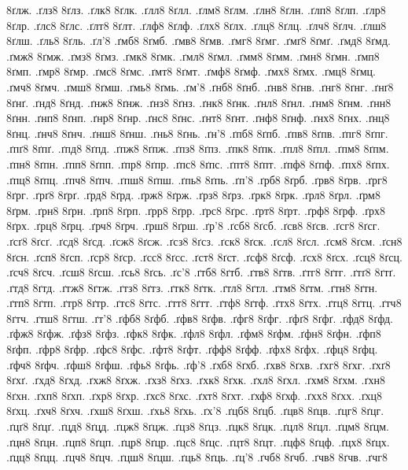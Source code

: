 {8ґлж.
.ґлз8
8ґлз.
.ґлк8
8ґлк.
.ґлл8
8ґлл.
.ґлм8
8ґлм.
.ґлн8
8ґлн.
.ґлп8
8ґлп.
.ґлр8
8ґлр.
.ґлс8
8ґлс.
.ґлт8
8ґлт.
.ґлф8
8ґлф.
.ґлх8
8ґлх.
.ґлц8
8ґлц.
.ґлч8
8ґлч.
.ґлш8
8ґлш.
.ґль8
8ґль.
.ґл'8
.ґмб8
8ґмб.
.ґмв8
8ґмв.
.ґмг8
8ґмг.
.ґмґ8
8ґмґ.
.ґмд8
8ґмд.
.ґмж8
8ґмж.
.ґмз8
8ґмз.
.ґмк8
8ґмк.
.ґмл8
8ґмл.
.ґмм8
8ґмм.
.ґмн8
8ґмн.
.ґмп8
8ґмп.
.ґмр8
8ґмр.
.ґмс8
8ґмс.
.ґмт8
8ґмт.
.ґмф8
8ґмф.
.ґмх8
8ґмх.
.ґмц8
8ґмц.
.ґмч8
8ґмч.
.ґмш8
8ґмш.
.ґмь8
8ґмь.
.ґм'8
.ґнб8
8ґнб.
.ґнв8
8ґнв.
.ґнг8
8ґнг.
.ґнґ8
8ґнґ.
.ґнд8
8ґнд.
.ґнж8
8ґнж.
.ґнз8
8ґнз.
.ґнк8
8ґнк.
.ґнл8
8ґнл.
.ґнм8
8ґнм.
.ґнн8
8ґнн.
.ґнп8
8ґнп.
.ґнр8
8ґнр.
.ґнс8
8ґнс.
.ґнт8
8ґнт.
.ґнф8
8ґнф.
.ґнх8
8ґнх.
.ґнц8
8ґнц.
.ґнч8
8ґнч.
.ґнш8
8ґнш.
.ґнь8
8ґнь.
.ґн'8
.ґпб8
8ґпб.
.ґпв8
8ґпв.
.ґпг8
8ґпг.
.ґпґ8
8ґпґ.
.ґпд8
8ґпд.
.ґпж8
8ґпж.
.ґпз8
8ґпз.
.ґпк8
8ґпк.
.ґпл8
8ґпл.
.ґпм8
8ґпм.
.ґпн8
8ґпн.
.ґпп8
8ґпп.
.ґпр8
8ґпр.
.ґпс8
8ґпс.
.ґпт8
8ґпт.
.ґпф8
8ґпф.
.ґпх8
8ґпх.
.ґпц8
8ґпц.
.ґпч8
8ґпч.
.ґпш8
8ґпш.
.ґпь8
8ґпь.
.ґп'8
.ґрб8
8ґрб.
.ґрв8
8ґрв.
.ґрг8
8ґрг.
.ґрґ8
8ґрґ.
.ґрд8
8ґрд.
.ґрж8
8ґрж.
.ґрз8
8ґрз.
.ґрк8
8ґрк.
.ґрл8
8ґрл.
.ґрм8
8ґрм.
.ґрн8
8ґрн.
.ґрп8
8ґрп.
.ґрр8
8ґрр.
.ґрс8
8ґрс.
.ґрт8
8ґрт.
.ґрф8
8ґрф.
.ґрх8
8ґрх.
.ґрц8
8ґрц.
.ґрч8
8ґрч.
.ґрш8
8ґрш.
.ґр'8
.ґсб8
8ґсб.
.ґсв8
8ґсв.
.ґсг8
8ґсг.
.ґсґ8
8ґсґ.
.ґсд8
8ґсд.
.ґсж8
8ґсж.
.ґсз8
8ґсз.
.ґск8
8ґск.
.ґсл8
8ґсл.
.ґсм8
8ґсм.
.ґсн8
8ґсн.
.ґсп8
8ґсп.
.ґср8
8ґср.
.ґсс8
8ґсс.
.ґст8
8ґст.
.ґсф8
8ґсф.
.ґсх8
8ґсх.
.ґсц8
8ґсц.
.ґсч8
8ґсч.
.ґсш8
8ґсш.
.ґсь8
8ґсь.
.ґс'8
.ґтб8
8ґтб.
.ґтв8
8ґтв.
.ґтг8
8ґтг.
.ґтґ8
8ґтґ.
.ґтд8
8ґтд.
.ґтж8
8ґтж.
.ґтз8
8ґтз.
.ґтк8
8ґтк.
.ґтл8
8ґтл.
.ґтм8
8ґтм.
.ґтн8
8ґтн.
.ґтп8
8ґтп.
.ґтр8
8ґтр.
.ґтс8
8ґтс.
.ґтт8
8ґтт.
.ґтф8
8ґтф.
.ґтх8
8ґтх.
.ґтц8
8ґтц.
.ґтч8
8ґтч.
.ґтш8
8ґтш.
.ґт'8
.ґфб8
8ґфб.
.ґфв8
8ґфв.
.ґфг8
8ґфг.
.ґфґ8
8ґфґ.
.ґфд8
8ґфд.
.ґфж8
8ґфж.
.ґфз8
8ґфз.
.ґфк8
8ґфк.
.ґфл8
8ґфл.
.ґфм8
8ґфм.
.ґфн8
8ґфн.
.ґфп8
8ґфп.
.ґфр8
8ґфр.
.ґфс8
8ґфс.
.ґфт8
8ґфт.
.ґфф8
8ґфф.
.ґфх8
8ґфх.
.ґфц8
8ґфц.
.ґфч8
8ґфч.
.ґфш8
8ґфш.
.ґфь8
8ґфь.
.ґф'8
.ґхб8
8ґхб.
.ґхв8
8ґхв.
.ґхг8
8ґхг.
.ґхґ8
8ґхґ.
.ґхд8
8ґхд.
.ґхж8
8ґхж.
.ґхз8
8ґхз.
.ґхк8
8ґхк.
.ґхл8
8ґхл.
.ґхм8
8ґхм.
.ґхн8
8ґхн.
.ґхп8
8ґхп.
.ґхр8
8ґхр.
.ґхс8
8ґхс.
.ґхт8
8ґхт.
.ґхф8
8ґхф.
.ґхх8
8ґхх.
.ґхц8
8ґхц.
.ґхч8
8ґхч.
.ґхш8
8ґхш.
.ґхь8
8ґхь.
.ґх'8
.ґцб8
8ґцб.
.ґцв8
8ґцв.
.ґцг8
8ґцг.
.ґцґ8
8ґцґ.
.ґцд8
8ґцд.
.ґцж8
8ґцж.
.ґцз8
8ґцз.
.ґцк8
8ґцк.
.ґцл8
8ґцл.
.ґцм8
8ґцм.
.ґцн8
8ґцн.
.ґцп8
8ґцп.
.ґцр8
8ґцр.
.ґцс8
8ґцс.
.ґцт8
8ґцт.
.ґцф8
8ґцф.
.ґцх8
8ґцх.
.ґцц8
8ґцц.
.ґцч8
8ґцч.
.ґцш8
8ґцш.
.ґць8
8ґць.
.ґц'8
.ґчб8
8ґчб.
.ґчв8
8ґчв.
.ґчг8
}
